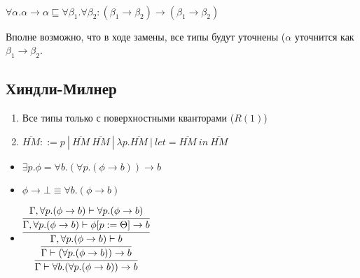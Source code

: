 \begin{example}\
	
$\forall \alpha . \alpha \rightarrow \alpha 
\sqsubseteq 
\forall \beta_1.\forall \beta_2: (\beta_1 \rightarrow \beta_2) \rightarrow (\beta_1 \rightarrow \beta_2)$

Вполне возможно, что в ходе замены, все типы будут уточнены ($\alpha$ уточнится как $\beta_1 \rightarrow \beta_2$.
\end{example}


\subsection{Хиндли-Милнер}

\begin{enumerate}
    \item Все типы только с поверхностными кванторами ($R(1)$)
    \item $\overline{HM} ::= p\ |\ \overline{HM}\ \overline{HM}\ |\ \lambda p. \overline{HM}\ |\ let =  \overline{HM}\ in\ \overline{HM}$
\end{enumerate}

\begin{itemize}
    \item $\exists p.\phi = \forall b.(\forall p. (\phi \rightarrow b)) \rightarrow b$
    \item $\phi \rightarrow \bot \equiv \forall b. (\phi \rightarrow b)$
    
    \item $\vcenter{\infer[]{\Gamma \vdash \forall b.(\forall p.(\phi \rightarrow b)) \rightarrow b}{\infer{\Gamma \vdash (\forall p. (\phi \rightarrow b)) \rightarrow b}{\infer{\Gamma, \forall p. (\phi \rightarrow b) \vdash b}{\infer{\Gamma, \forall p. (\phi \rightarrow b) \vdash \phi [p := \Theta] \rightarrow b}{\Gamma, \forall p. (\phi \rightarrow b) \vdash \forall p.(\phi \rightarrow b)}}}}}$
\end{itemize}

